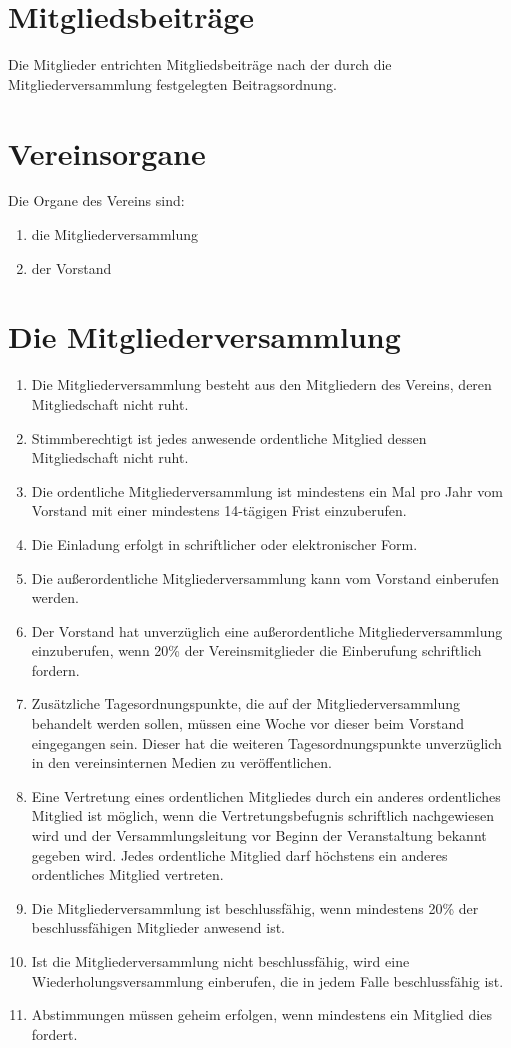 \documentclass[a4paper, 12pt]{scrartcl}
\begin{document}
\section{Mitgliedsbeiträge}
Die Mitglieder entrichten Mitgliedsbeiträge nach der durch die Mitgliederversammlung festgelegten Beitragsordnung.

\section{Vereinsorgane}
Die Organe des Vereins sind:
\begin{enumerate}
  \item die Mitgliederversammlung
  \item der Vorstand
\end{enumerate}

\section{Die Mitgliederversammlung}
\begin{enumerate}
  \item Die Mitgliederversammlung besteht aus den Mitgliedern des Vereins, deren Mitgliedschaft nicht ruht.
  \item Stimmberechtigt ist jedes anwesende ordentliche Mitglied dessen Mitgliedschaft nicht ruht.
  \item Die ordentliche Mitgliederversammlung ist mindestens ein Mal pro Jahr vom Vorstand mit einer mindestens 14-tägigen Frist einzuberufen.
  \item Die Einladung erfolgt in schriftlicher oder elektronischer Form.
  \item Die außerordentliche Mitgliederversammlung kann vom Vorstand einberufen werden.
  \item Der Vorstand hat unverzüglich eine außerordentliche Mitgliederversammlung einzuberufen, wenn 20\% der Vereinsmitglieder die Einberufung schriftlich fordern.
  \item Zusätzliche Tagesordnungspunkte, die auf der Mitgliederversammlung behandelt werden sollen, müssen eine Woche vor dieser beim Vorstand eingegangen sein. Dieser hat die weiteren Tagesordnungspunkte unverzüglich in den vereinsinternen Medien zu veröffentlichen.
  \item Eine Vertretung eines ordentlichen Mitgliedes durch ein anderes ordentliches Mitglied ist möglich, wenn die Vertretungsbefugnis schriftlich nachgewiesen wird und der Versammlungsleitung vor Beginn der Veranstaltung bekannt gegeben wird. Jedes ordentliche Mitglied darf höchstens ein anderes ordentliches Mitglied vertreten.
  \item Die Mitgliederversammlung ist beschlussfähig, wenn mindestens 20\% der beschlussfähigen Mitglieder anwesend ist.
  \item Ist die Mitgliederversammlung nicht beschlussfähig, wird eine Wiederholungsversammlung einberufen, die in jedem Falle beschlussfähig ist.
  \item Abstimmungen müssen geheim erfolgen, wenn mindestens ein Mitglied dies fordert.
\end{enumerate}
\end{document}
